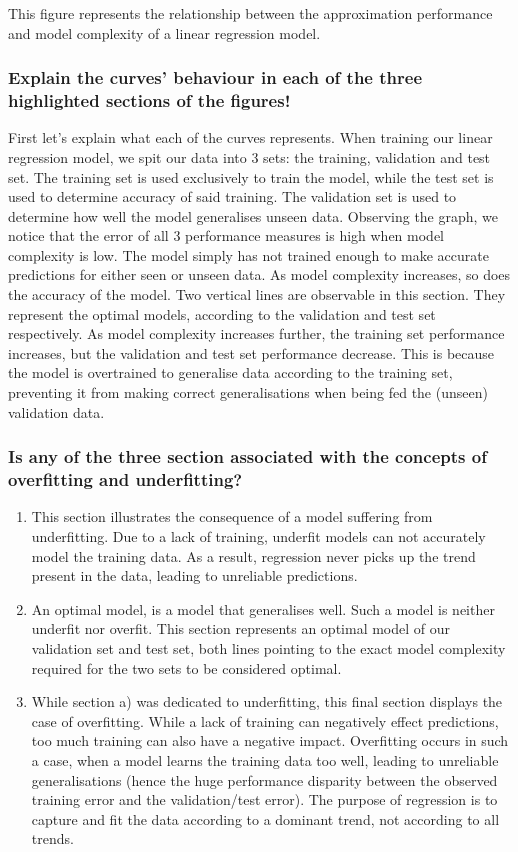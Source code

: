 \documentclass[12pt,a4paper]{article}
\begin{document}
This figure represents the relationship between the approximation performance and model complexity of a linear regression model.

\subsubsection*{Explain the curves' behaviour in each of the three highlighted sections of the figures!}

First let's explain what each of the curves represents. When training our linear regression model, we spit our data into 3 sets: the training, validation and test set. The training set is used exclusively to train the model, while the test set is used to determine accuracy of said training. The validation set is used to determine how well the model generalises unseen data. Observing the graph, we notice that the error of all 3 performance measures is high when model complexity is low. The model simply has not trained enough to make accurate predictions for either seen or unseen data. As model complexity increases, so does the accuracy of the model. Two vertical lines are observable in this section. They represent the optimal models, according to the validation and test set respectively. As model complexity increases further, the training set performance increases, but the validation and test set performance decrease. This is because the model is overtrained to generalise data according to the training set, preventing it from making correct generalisations when being fed the (unseen) validation data.

\subsubsection*{Is any of the three section associated with the concepts of overfitting and underfitting?}

\begin{enumerate}[label=\alph*)]
\itemsep-0.25em 
	\item This section illustrates the consequence of a model suffering from underfitting. Due to a lack of training, underfit models can not accurately model the training data. As a result, regression never picks up the trend present in the data, leading to unreliable predictions.
	\item An optimal model, is a model that generalises well. Such a model is neither underfit nor overfit. This section represents an optimal model of our validation set and test set, both lines pointing to the exact model complexity required for the two sets to be considered optimal.
	\item While section a) was dedicated to underfitting, this final section displays the case of overfitting. While a lack of training can negatively effect predictions, too much training can also have a negative impact. Overfitting occurs in such a case, when a model learns the training data too well, leading to unreliable generalisations (hence the huge performance disparity between the observed training error and the validation/test error). The purpose of regression is to capture and fit the data according to a dominant trend, not according to all trends.
\end{enumerate}
\end{document}
